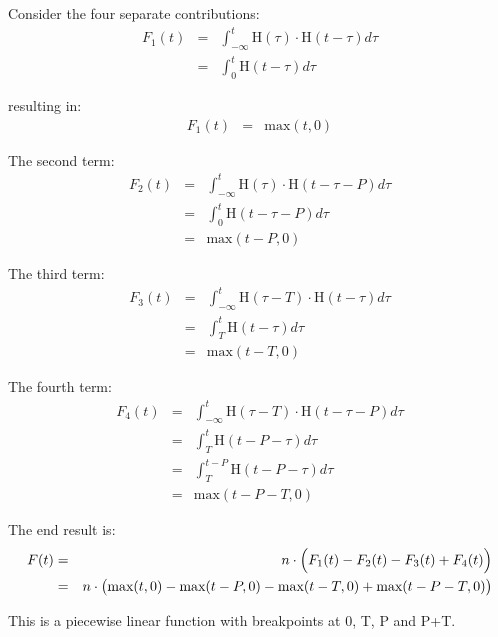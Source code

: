 \documentclass[onecolumn]{article}
\begin{document}
Consider the four separate contributions:
\begin{eqnarray}
             F_1(t) &=& \int_{-\infty}^t \textrm{H}(\tau) \cdot \textrm{H}(t-\tau) d\tau \\
\nonumber           &=& \int_0^t \textrm{H}(t-\tau) d\tau
\end{eqnarray}

\noindent resulting in:
\begin{eqnarray}
             F_1(t) &=& \textrm{max} (t, 0)
\end{eqnarray}

The second term:
\begin{eqnarray}
             F_2(t) &=& \int_{-\infty}^t \textrm{H}(\tau) \cdot \textrm{H}(t-\tau-P) d\tau \\
\nonumber           &=& \int_0^t \textrm{H}(t-\tau-P) d\tau     \\
\nonumber           &=& \textrm{max}( t-P, 0)
\end{eqnarray}

The third term:
\begin{eqnarray}
             F_3(t) &=& \int_{-\infty}^t \textrm{H}(\tau-T) \cdot \textrm{H}(t-\tau) d\tau \\
\nonumber           &=& \int_T^t \textrm{H}(t-\tau) d\tau \\
\nonumber           &=& \textrm{max}( t-T, 0)
\end{eqnarray}

The fourth term:
\begin{eqnarray}
             F_4(t) &=& \int_{-\infty}^t \textrm{H}(\tau-T) \cdot \textrm{H}(t-\tau-P) d\tau \\
\nonumber           &=& \int_T^t \textrm{H}(t-P-\tau) d\tau \\
\nonumber           &=& \int_T^{t-P} \textrm{H}(t-P-\tau) d\tau \\
\nonumber           &=& \textrm{max}( t-P-T, 0)
\end{eqnarray}

The end result is:
\begin{eqnarray}
             F(t) &=& n \cdot \Bigl( F_1(t) - F_2(t) - F_3(t) + F_4(t) \Bigr) \\
\nonumber         &=& n \cdot \bigl( \textrm{max}(t,0) - \textrm{max}(t-P,0) - \textrm{max}(t-T,0) + \textrm{max}(t-P-T,0) \bigr)
\end{eqnarray}

This is a piecewise linear function with breakpoints at 0, T, P and P+T.
\end{document}
